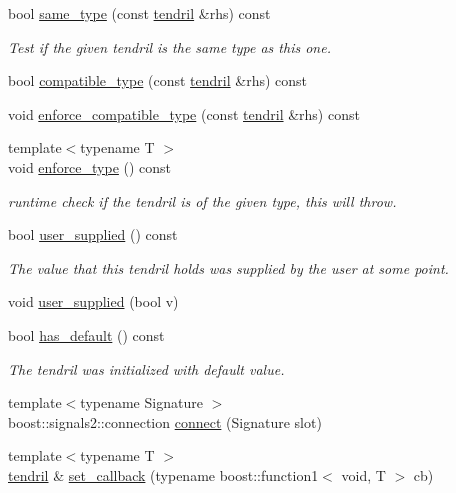 \begin{DoxyCompactItemize}
bool \hyperlink{classecto_1_1tendril_a7974ef8e1d4cd1936a72c429c0f3dbf7}{same\+\_\+type} (const \hyperlink{classecto_1_1tendril}{tendril} \&rhs) const 
\begin{DoxyCompactList}\small\item\em Test if the given tendril is the same type as this one. \end{DoxyCompactList}\item 
bool \hyperlink{classecto_1_1tendril_a7033cbab493d0120443b69c951e5d26c}{compatible\+\_\+type} (const \hyperlink{classecto_1_1tendril}{tendril} \&rhs) const 
\item 
void \hyperlink{classecto_1_1tendril_ae856d0e8b9b6eb899e9b6a9b6472e231}{enforce\+\_\+compatible\+\_\+type} (const \hyperlink{classecto_1_1tendril}{tendril} \&rhs) const 
\item 
{\footnotesize template$<$typename T $>$ }\\void \hyperlink{classecto_1_1tendril_a9322a1212d70252a9a7c4f5192871475}{enforce\+\_\+type} () const 
\begin{DoxyCompactList}\small\item\em runtime check if the tendril is of the given type, this will throw. \end{DoxyCompactList}\item 
bool \hyperlink{classecto_1_1tendril_a8c46edfd052cdae0fef4705d5f5943c6}{user\+\_\+supplied} () const 
\begin{DoxyCompactList}\small\item\em The value that this tendril holds was supplied by the user at some point. \end{DoxyCompactList}\item 
void \hyperlink{classecto_1_1tendril_a3aa500420a52a0546e21105b3fb96ad0}{user\+\_\+supplied} (bool v)
\item 
bool \hyperlink{classecto_1_1tendril_af8a2ace0ae30083415116db06644ba17}{has\+\_\+default} () const 
\begin{DoxyCompactList}\small\item\em The tendril was initialized with default value. \end{DoxyCompactList}\item 
{\footnotesize template$<$typename Signature $>$ }\\boost\+::signals2\+::connection \hyperlink{classecto_1_1tendril_a94a24ca32acd13f83f5af41030a77fdf}{connect} (Signature slot)
\item 
{\footnotesize template$<$typename T $>$ }\\\hyperlink{classecto_1_1tendril}{tendril} \& \hyperlink{classecto_1_1tendril_ab3c536756c1b4eb24c97691d23eb485a}{set\+\_\+callback} (typename boost\+::function1$<$ void, T $>$ cb)

\end{DoxyCompactItemize}
